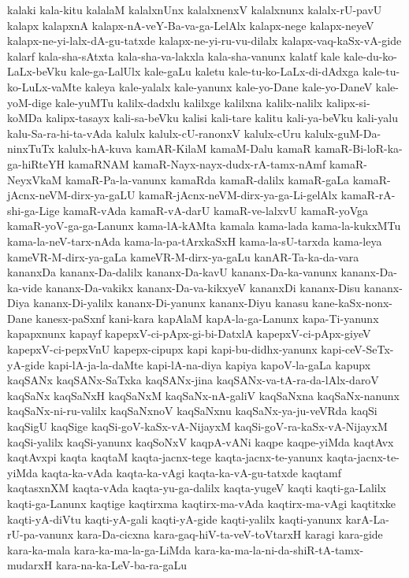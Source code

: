 {kalaki
kala-kitu
kalalaM
kalalxnUnx
kalalxnenxV
kalalxnunx
kalalx-rU-pavU
kalapx
kalapxnA
kalapx-nA-veY-Ba-va-ga-LelAlx
kalapx-nege
kalapx-neyeV
kalapx-ne-yi-lalx-dA-gu-tatxde
kalapx-ne-yi-ru-vu-dilalx
kalapx-vaq-kaSx-vA-gide
kalarf
kala-sha-sAtxta
kala-sha-va-lakxla
kala-sha-vanunx
kalatf
kale
kale-du-ko-LaLx-beVku
kale-ga-LalUlx
kale-gaLu
kaletu
kale-tu-ko-LaLx-di-dAdxga
kale-tu-ko-LuLx-vaMte
kaleya
kale-yalalx
kale-yanunx
kale-yo-Dane
kale-yo-DaneV
kale-yoM-dige
kale-yuMTu
kalilx-dadxlu
kalilxge
kalilxna
kalilx-nalilx
kalipx-si-koMDa
kalipx-tasayx
kali-sa-beVku
kalisi
kali-tare
kalitu
kali-ya-beVku
kali-yalu
kalu-Sa-ra-hi-ta-vAda
kalulx
kalulx-cU-ranonxV
kalulx-cUru
kalulx-guM-Da-ninxTuTx
kalulx-hA-kuva
kamAR-KilaM
kamaM-Dalu
kamaR
kamaR-Bi-loR-ka-ga-hiRteYH
kamaRNAM
kamaR-Nayx-nayx-dudx-rA-tamx-nAmf
kamaR-NeyxVkaM
kamaR-Pa-la-vanunx
kamaRda
kamaR-dalilx
kamaR-gaLa
kamaR-jAcnx-neVM-dirx-ya-gaLU
kamaR-jAcnx-neVM-dirx-ya-ga-Li-gelAlx
kamaR-rA-shi-ga-Lige
kamaR-vAda
kamaR-vA-darU
kamaR-ve-lalxvU
kamaR-yoVga
kamaR-yoV-ga-ga-Lanunx
kama-lA-kAMta
kamala
kama-lada
kama-la-kukxMTu
kama-la-neV-tarx-nAda
kama-la-pa-tArxkaSxH
kama-la-sU-tarxda
kama-leya
kameVR-M-dirx-ya-gaLa
kameVR-M-dirx-ya-gaLu
kanAR-Ta-ka-da-vara
kananxDa
kananx-Da-dalilx
kananx-Da-kavU
kananx-Da-ka-vanunx
kananx-Da-ka-vide
kananx-Da-vakikx
kananx-Da-va-kikxyeV
kananxDi
kananx-Disu
kananx-Diya
kananx-Di-yalilx
kananx-Di-yanunx
kananx-Diyu
kanasu
kane-kaSx-nonx-Dane
kanesx-paSxnf
kani-kara
kapAlaM
kapA-la-ga-Lanunx
kapa-Ti-yanunx
kapapxnunx
kapayf
kapepxV-ci-pApx-gi-bi-DatxlA
kapepxV-ci-pApx-giyeV
kapepxV-ci-pepxVnU
kapepx-cipupx
kapi
kapi-bu-didhx-yanunx
kapi-ceV-SeTx-yA-gide
kapi-lA-ja-la-daMte
kapi-lA-na-diya
kapiya
kapoV-la-gaLa
kapupx
kaqSANx
kaqSANx-SaTxka
kaqSANx-jina
kaqSANx-va-tA-ra-da-lAlx-daroV
kaqSaNx
kaqSaNxH
kaqSaNxM
kaqSaNx-nA-galiV
kaqSaNxna
kaqSaNx-nanunx
kaqSaNx-ni-ru-valilx
kaqSaNxnoV
kaqSaNxnu
kaqSaNx-ya-ju-veVRda
kaqSi
kaqSigU
kaqSige
kaqSi-goV-kaSx-vA-NijayxM
kaqSi-goV-ra-kaSx-vA-NijayxM
kaqSi-yalilx
kaqSi-yanunx
kaqSoNxV
kaqpA-vANi
kaqpe
kaqpe-yiMda
kaqtAvx
kaqtAvxpi
kaqta
kaqtaM
kaqta-jacnx-tege
kaqta-jacnx-te-yanunx
kaqta-jacnx-te-yiMda
kaqta-ka-vAda
kaqta-ka-vAgi
kaqta-ka-vA-gu-tatxde
kaqtamf
kaqtasxnXM
kaqta-vAda
kaqta-yu-ga-dalilx
kaqta-yugeV
kaqti
kaqti-ga-Lalilx
kaqti-ga-Lanunx
kaqtige
kaqtirxma
kaqtirx-ma-vAda
kaqtirx-ma-vAgi
kaqtitxke
kaqti-yA-diVtu
kaqti-yA-gali
kaqti-yA-gide
kaqti-yalilx
kaqti-yanunx
karA-La-rU-pa-vanunx
kara-Da-cicxna
kara-gaq-hiV-ta-veV-toVtarxH
karagi
kara-gide
kara-ka-mala
kara-ka-ma-la-ga-LiMda
kara-ka-ma-la-ni-da-shiR-tA-tamx-mudarxH
kara-na-ka-LeV-ba-ra-gaLu
}
